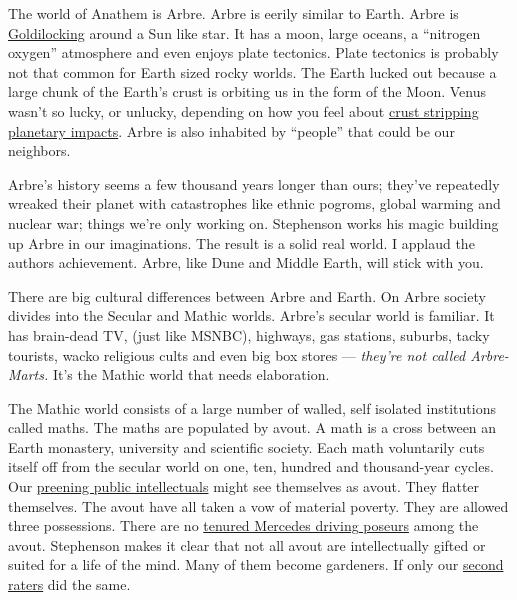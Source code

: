 The world of Anathem is Arbre. Arbre is eerily similar to Earth. Arbre
is \href{http://en.wikipedia.org/wiki/Habitable\_zone}{Goldilocking}
around a Sun like star. It has a moon, large oceans, a ``nitrogen
oxygen'' atmosphere and even enjoys plate tectonics. Plate tectonics is
probably not that common for Earth sized rocky worlds. The Earth lucked
out because a large chunk of the Earth's crust is orbiting us in the
form of the Moon. Venus wasn't so lucky, or unlucky, depending on how
you feel about \href{http://www.lpl.arizona.edu/outreach/origin/}{crust
stripping planetary impacts}. Arbre is also inhabited by ``people'' that
could be our neighbors.

Arbre's history seems a few thousand years longer than ours; they've
repeatedly wreaked their planet with catastrophes like ethnic pogroms,
global warming and nuclear war; things we're only working on. Stephenson
works his magic building up Arbre in our imaginations. The result is a
solid real world. I applaud the authors achievement. Arbre, like Dune
and Middle Earth, will stick with you.

There are big cultural differences between Arbre and Earth. On Arbre
society divides into the Secular and Mathic worlds. Arbre's secular
world is familiar. It has brain-dead TV, (just like MSNBC), highways,
gas stations, suburbs, tacky tourists, wacko religious cults and even
big box stores --- \emph{they're not called Arbre-Marts.} It's the
Mathic world that needs elaboration.

The Mathic world consists of a large number of walled, self isolated
institutions called maths. The maths are populated by avout. A math is a
cross between an Earth monastery, university and scientific society.
Each math voluntarily cuts itself off from the secular world on one,
ten, hundred and thousand-year cycles. Our
\href{http://en.wikipedia.org/wiki/Paul\_Krugman}{preening public
intellectuals} might see themselves as avout. They flatter themselves.
The avout have all taken a vow of material poverty. They are allowed
three possessions. There are no
\href{http://www.canadafreepress.com/index.php/article/32367}{tenured
Mercedes driving poseurs} among the avout. Stephenson makes it clear
that not all avout are intellectually gifted or suited for a life of the
mind. Many of them become gardeners. If only our
\href{http://www.algore.com/}{second raters} did the same.

